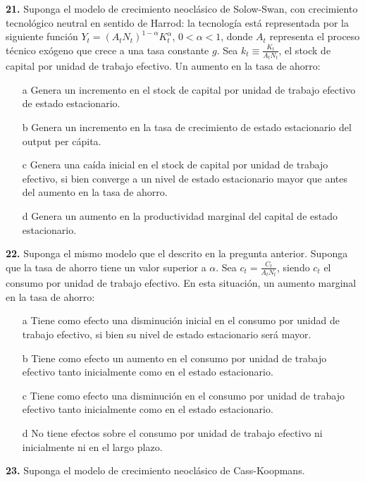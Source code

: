 \documentclass{nuevotema}
\begin{document}

\textbf{21.} Suponga el modelo de crecimiento neoclásico de Solow-Swan, con crecimiento tecnológico neutral en sentido de Harrod: la tecnología está representada por la siguiente función $Y_t = \left( A_t N_t \right)^{1-\alpha} K_t^\alpha$, $0<\alpha<1$, donde $A_t$ representa el proceso técnico exógeno que crece a una tasa constante $g$. Sea $k_t \equiv \frac{K_t}{A_t N_t}$, el stock de capital por unidad de trabajo efectivo. Un aumento en la tasa de ahorro:

\begin{itemize}
	\item[a] Genera un incremento en el stock de capital por unidad de trabajo efectivo de estado estacionario.
	\item[b] Genera un incremento en la tasa de crecimiento de estado estacionario del output per cápita. 
	\item[c] Genera una caída inicial en el stock de capital por unidad de trabajo efectivo, si bien converge a un nivel de estado estacionario mayor que antes del aumento en la tasa de ahorro.
	\item[d] Genera un aumento en la productividad marginal del capital de estado estacionario.
\end{itemize}

\textbf{22.} Suponga el mismo modelo que el descrito en la pregunta anterior. Suponga que la tasa de ahorro tiene un valor superior a $\alpha$. Sea $c_t = \frac{C_t}{A_t N_t}$, siendo $c_t$ el consumo por unidad de trabajo efectivo. En esta situación, un aumento marginal en la tasa de ahorro:

\begin{itemize}
	\item[a] Tiene como efecto una disminución inicial en el consumo por unidad de trabajo efectivo, si bien su nivel de estado estacionario será mayor.
	\item[b] Tiene como efecto un aumento en el consumo por unidad de trabajo efectivo tanto inicialmente como en el estado estacionario.
	\item[c] Tiene como efecto una disminución en el consumo por unidad de trabajo efectivo tanto inicialmente como en el estado estacionario.
	\item[d] No tiene efectos sobre el consumo por unidad de trabajo efectivo ni inicialmente ni en el largo plazo.
\end{itemize}

\textbf{23.} Suponga el modelo de crecimiento neoclásico de Cass-Koopmans.
\end{document}
